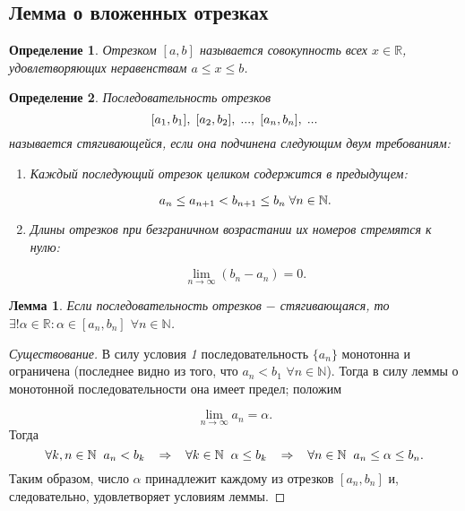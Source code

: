 \documentclass{article}
\newtheorem*{lemma}{Лемма}
\newtheorem{definition}{Определение}[section]
\begin{document}
\subsection{Лемма о вложенных отрезках}

\begin{definition}
Отрезком \([a, b]\) называется совокупность всех \(x \in \mathbb{R}\), удовлетворяющих неравенствам \(a \leq x \leq b\).
\end{definition}

\begin{definition}
Последовательность отрезков
\[
[a_1, b_1], \hspace{1mm} [a_2, b_2], \hspace{1mm} ..., \hspace{1mm} [a_n, b_n], \hspace{1mm} ...
\]
называется стягивающейся, если она подчинена следующим двум требованиям:
\begin{enumerate}
    \item Каждый последующий отрезок целиком содержится в предыдущем:

    \[a_n \leq a_{n + 1} < b_{n + 1} \leq b_n \hspace{1mm} \forall n \in \mathbb{N}.\]

    \item Длины отрезков при безграничном возрастании их номеров стремятся к нулю:

    \[\lim_{n \to \infty} (b_n - a_n) = 0.\]

\end{enumerate}

\end{definition}

\begin{lemma}
Если последовательность отрезков \(-\) стягивающаяся, то \(\exists! \alpha \in \mathbb{R} : \alpha \in [a_n, b_n]\) \(\forall n \in \mathbb{N}\).
\end{lemma}

\begin{proof}[Существование]
В силу условия \textit{1} последовательность \(\{a_n\}\) монотонна и ограничена (последнее видно из того, что \(a_n < b_1\) \(\forall n \in \mathbb{N}\)). Тогда в силу леммы о монотонной последовательности она имеет предел; положим

\[\lim_{n \to \infty} a_n = \alpha.\]
Тогда
\[
\forall k, n \in \mathbb{N} \hspace{2mm}
a_n < b_k
\hspace{3mm} \Rightarrow \hspace{3mm}
\forall k \in \mathbb{N} \hspace{2mm}
\alpha \leq b_k
\hspace{3mm} \Rightarrow \hspace{3mm}
\forall n \in \mathbb{N} \hspace{2mm}
a_n \leq \alpha \leq b_n.
\]
Таким образом, число \(\alpha\) принадлежит каждому из отрезков \([a_n, b_n]\) и, следовательно, удовлетворяет условиям леммы.
\end{proof}
\end{document}
